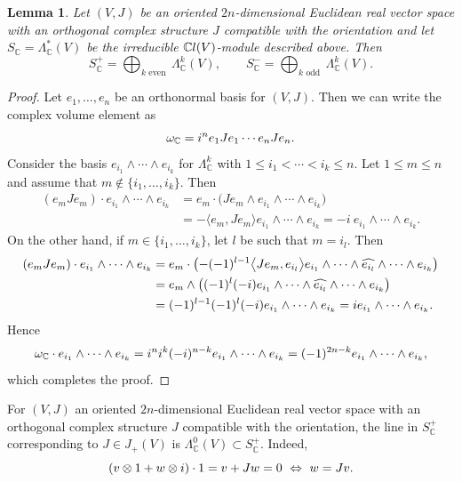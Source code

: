\documentclass[11pt]{article}
\numberwithin{equation}{section}
\newcommand{\C}{\mathbb{C}}
\newcommand{\CCl}{\mathbb{C}{\rm l}}
\numberwithin{equation}{section}
\newtheorem{Lemma}[Theorem]{Lemma}
\begin{document}
\begin{Lemma}\label{plusmin}
Let $(V,J)$ be an oriented $2n$-dimensional Euclidean real vector space with an orthogonal complex structure $J$ compatible with the orientation and let $S_\C=\Lambda^*_\C(V)$ be the irreducible $\CCl(V)$-module described above. Then
\[
S_\C^+ = \bigoplus_{k \text{ even }} \Lambda_\C^k(V), \qquad S_\C^- = \bigoplus_{k \text{ odd }} \Lambda_\C^k(V).
\]
\end{Lemma}
\begin{proof}
Let $e_1, \ldots, e_n$ be an orthonormal basis for $(V,J)$. Then we can write the complex volume element as
\[
\omega_\C = {\rm i}^n e_1 Je_1 \cdots e_n Je_n .
\]
Consider the basis $e_{i_1} \wedge \cdots \wedge e_{i_k}$ for $\Lambda^k_{\C}$ with $1\leq i_1 < \cdots < i_k \leq n$. Let $1 \leq m \leq n$
and assume that $m \not \in \{i_1, \ldots, i_k \}$. Then
\[
\begin{aligned}
(e_m Je_m) \cdot e_{i_1} \wedge \cdots \wedge e_{i_k} & = e_m \cdot \big( Je_m \wedge e_{i_1} \wedge \cdots \wedge e_{i_k} \big) \\
& = -\big\langle e_m, Je_m \big\rangle e_{i_1} \wedge \cdots \wedge e_{i_k} = -i \ e_{i_1} \wedge \cdots \wedge e_{i_k}.
\end{aligned}
\]
On the other hand, if $m \in \{i_1, \ldots, i_k\}$, let $l$ be such that $m=i_l$. Then
\[
\begin{aligned}
(e_m Je_m) \cdot e_{i_1} \wedge \cdots \wedge e_{i_k} & = e_m \cdot \big( {-} (-1)^{l-1} \big\langle Je_m, e_{i_l} \big\rangle e_{i_1} \wedge \cdots \wedge \widehat{e_{i_l}} \wedge \cdots \wedge e_{i_k} \big)\\
& = e_m \wedge\big( (-1)^l (-{\rm i}) e_{i_1} \wedge \cdots \wedge \widehat{e_{i_l}} \wedge \cdots \wedge e_{i_k} \big) \\
& = (-1)^{l-1} (-1)^l(-{\rm i}) e_{i_1} \wedge \cdots \wedge e_{i_k} = {\rm i} e_{i_1} \wedge \cdots \wedge e_{i_k}.
\end{aligned}
\]
Hence
\[
\omega_\C \cdot e_{i_1} \wedge \cdots \wedge e_{i_k} = {\rm i}^n {\rm i}^k (-{\rm i})^{n-k} e_{i_1} \wedge \cdots \wedge e_{i_k} = (-1)^{2n-k} e_{i_1} \wedge \cdots \wedge e_{i_k},
\]
which completes the proof.
\end{proof}

\begin{Remark}
\label{lift}
For $(V,J)$ an oriented $2n$-dimensional Euclidean real vector space with an orthogonal complex structure $J$ compatible with the orientation, the line in $S^+_\C$ corresponding to $J\in J_+(V)$ is $\Lambda^0_\C(V)\subset S_\C^+$.
Indeed,
\[(v \otimes 1 + w \otimes {\rm i}) \cdot 1 = v+Jw = 0 \ \Leftrightarrow \ w=Jv. \]
\end{Remark}
\end{document}
